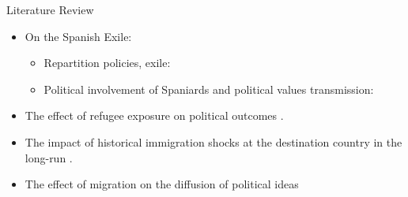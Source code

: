 \documentclass[xcolor=dvipsnames, aspectratio=169]{beamer}
\begin{document}
\begin{frame}{Literature Review}


\vspace{0.1in}

\begin{itemize}
    \begin{itemize}
    \pause 
    \item On the Spanish Exile:
    \begin{itemize}
    \vspace{0.1in}
    \item Repartition policies, exile:
    \vspace{0.1in}
    \item Political involvement of Spaniards and political values transmission:
    \end{itemize}
    \vspace{0.1in}
    \pause
        \item The effect of refugee exposure on political outcomes \textcolor{gray}{\citep{halla_immigration_2017, dustmann_refugee_2018, hangartner_refugee_2019, edo_immigration_2019, steinmayr_contact_2021, alesina_political_2024}}. 
        \pause
            \vspace{0.1in}
        \item The impact of historical immigration shocks at the destination country in the long-run \textcolor{gray}{\citep{tabellini_gifts_2020, schindler_shocking_2021, bursztyn_immigrant_2024, chevalier_forced_2024, ochsner_activated_2024, toews_enemies_2025}}.
        \pause
            \vspace{0.1in}
        \item The effect of migration on the diffusion of political ideas \textcolor{gray}{\citep{spilimbergo_democracy_2009, barsbai_effect_2017, dippel_leadership_2021, calderon_racial_2023, bazzi_confederate_2023}}        
    \end{itemize}
\end{itemize}



\end{frame}
\end{document}
